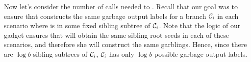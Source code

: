 Now let’s consider the number of calls needed to \Ev.
Recall that our goal was to ensure that \E constructs the same garbage output labels for a branch $\mathcal C_i$ in each scenario where \aid is in some fixed sibling subtree of $\mathcal C_i$. Note that the logic of our gadget ensures that \E will obtain the same sibling root seeds in each of these scenarios, and therefore she will construct the same garblings. Hence, since there are $\log b$ sibling subtrees of $\mathcal C_i$, $\mathcal C_i$ has only $\log b$ possible garbage output labels.






















